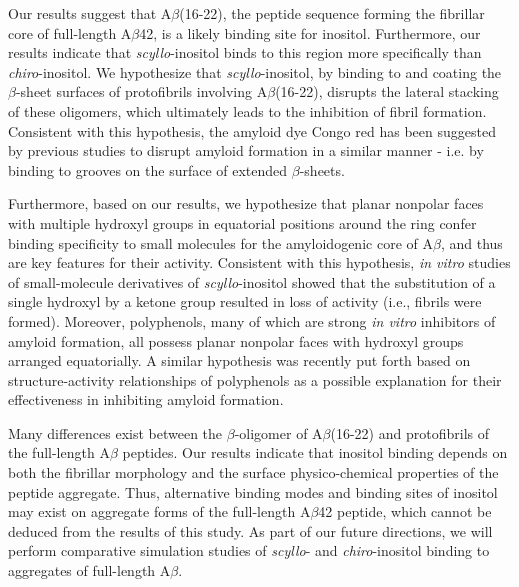 Our results suggest that A$\beta$(16-22), the peptide sequence forming the fibrillar core of full-length A$\beta$42, is a likely binding site for inositol. Furthermore, our results indicate that \emph{scyllo}-inositol binds to this region more specifically than \emph{chiro}-inositol. We hypothesize that \emph{scyllo}-inositol, by binding to and coating the $\beta$-sheet surfaces of protofibrils involving A$\beta$(16-22), disrupts the lateral stacking of these oligomers, which ultimately leads to the inhibition of fibril formation. Consistent with this hypothesis, the amyloid dye Congo red has been suggested by previous studies to disrupt amyloid formation in a similar manner - i.e. by binding to grooves on the surface of extended $\beta$-sheets.\cite{Shea:2012eh,Wu:2007p361}

Furthermore, based on our results, we hypothesize that planar nonpolar faces with multiple hydroxyl groups in equatorial positions around the ring confer binding specificity to small molecules for the amyloidogenic core of A$\beta$, and thus are key features for their activity. Consistent with this hypothesis, \emph{in vitro} studies of small-molecule derivatives of \emph{scyllo}-inositol showed that the substitution of a single hydroxyl by a ketone group resulted in loss of activity (i.e., fibrils were formed).\cite{Nitz:2008p13,Sun:2008p208,McLaurin:2000p64} Moreover, polyphenols, many of which are strong \emph{in vitro} inhibitors of amyloid formation, all possess planar nonpolar faces with hydroxyl groups arranged equatorially. A similar hypothesis was recently put forth based on structure-activity relationships of polyphenols as a possible explanation for their effectiveness in inhibiting amyloid formation. \cite{Porat:2006p33}

Many differences exist between the $\beta$-oligomer of A$\beta$(16-22) and protofibrils of the full-length A$\beta$ peptides. Our results indicate that inositol binding depends on both the fibrillar morphology and the surface physico-chemical properties of the peptide aggregate. Thus, alternative binding modes and binding sites of inositol may exist on aggregate forms of the full-length A$\beta$42 peptide, which cannot be deduced from the results of this study. As part of our future directions, we will perform comparative simulation studies of \emph{scyllo}- and \emph{chiro}-inositol binding to aggregates of full-length A$\beta$.

